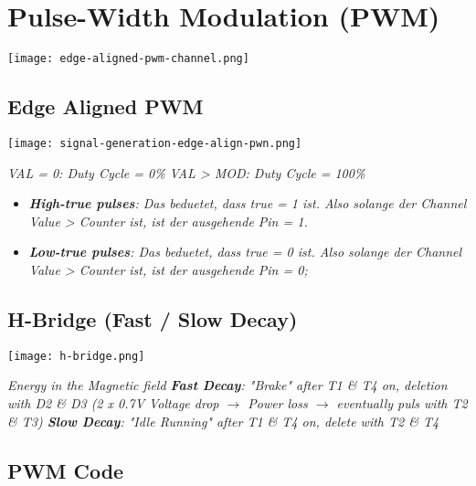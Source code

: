 \section{Pulse-Width Modulation (PWM)}

\texttt{[image: edge-aligned-pwm-channel.png]}

\subsection{Edge Aligned PWM}

\texttt{[image: signal-generation-edge-align-pwn.png]}

\textit{
    VAL = 0: Duty Cycle = 0\% \newline
    VAL > MOD: Duty Cycle = 100\%
}

\begin{itemize}
    \item{
        \textit{
            \textbf{High-true pulses}: Das beduetet, dass true = 1 ist. Also solange der Channel Value >
            Counter ist, ist der ausgehende Pin = 1.
        }
    }
    \item{
        \textit{
            \textbf{Low-true pulses}: Das beduetet, dass true = 0 ist. Also solange der Channel Value >
            Counter ist, ist der ausgehende Pin = 0;
        }
    }
\end{itemize}

\subsection{H-Bridge (Fast / Slow Decay)}

\texttt{[image: h-bridge.png]}

\textit{
    Energy in the Magnetic field
    \newline
    \textbf{Fast Decay}: "Brake"
    after T1 \& T4 on, deletion with D2
    \& D3 (2 x 0.7V Voltage drop $\rightarrow$ Power
    loss $\rightarrow$ eventually puls with T2 \& T3)
    \newline
    \textbf{Slow Decay}: "Idle Running"
    after T1 \& T4 on, delete with T2 \& T4
}

\subsection{PWM Code}

